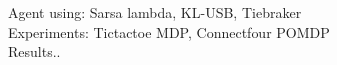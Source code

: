 Agent using: Sarsa lambda, KL-USB, Tiebraker \\
Experiments: Tictactoe MDP, Connectfour POMDP \\
Results..